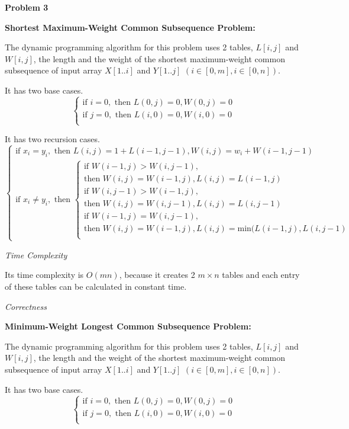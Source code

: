 \documentclass[12pt,letterpaper]{article}
\def\pp{\par\noindent}
\newcommand{\problem}[1]{ \bigskip \pp \textbf{Problem #1}\par}
\begin{document}
\problem{3}
\noindent\textbf{Shortest Maximum-Weight Common Subsequence Problem:}\par
The dynamic programming algorithm for this problem uses 2 tables, $L[i, j]$ and $W[i, j]$, the length and the weight of the shortest maximum-weight common subsequence of input array $X[1..i]$ and $Y[1..j]$ $(i\in[0,m], i\in[0,n])$.\par
It has two base cases.
\[
	\begin{cases}
		\text{if } i=0, \text{ then } L(0,j)=0, W(0,j)=0\\
		\text{if } j=0, \text{ then } L(i,0)=0, W(i,0)=0\\
	\end{cases}
\]\par
It has two recursion cases.
\[
	\begin{cases}
		\text{if } x_i=y_i, \text{ then } L(i,j)=1+L(i-1, j-1), W(i,j)=w_i+W(i-1, j-1)\\
		\text{if } x_i\neq y_i, \text{ then } 
		\begin{cases}
			\text{if } W(i-1,j) > W(i,j-1),\\
			\text{then } W(i,j)=W(i-1,j), L(i,j)=L(i-1,j)\\
			\text{if } W(i,j-1) > W(i-1,j),\\
			\text{then } W(i,j)=W(i,j-1), L(i,j)=L(i,j-1)\\
			\text{if } W(i-1,j) = W(i,j-1),\\
			\text{then } W(i,j)=W(i-1,j), L(i,j)=\text{min}(L(i-1,j), L(i,j-1)\\
		\end{cases}
	\end{cases}
\]\par
\medskip\noindent\textit{Time Complexity}\par
Its time complexity is $O(mn)$, because it creates 2 $m\times n$ tables and each entry of these tables can be calculated in constant time.\par
\medskip\noindent\textit{Correctness}\par
\medskip
\noindent\textbf{Minimum-Weight Longest Common Subsequence Problem:}\par
The dynamic programming algorithm for this problem uses 2 tables, $L[i, j]$ and $W[i, j]$, the length and the weight of the shortest maximum-weight common subsequence of input array $X[1..i]$ and $Y[1..j]$ $(i\in[0,m], i\in[0,n])$.\par
It has two base cases.
\[
	\begin{cases}
		\text{if } i=0, \text{ then } L(0,j)=0, W(0,j)=0\\
		\text{if } j=0, \text{ then } L(i,0)=0, W(i,0)=0\\
	\end{cases}
\]\par
\end{document}
